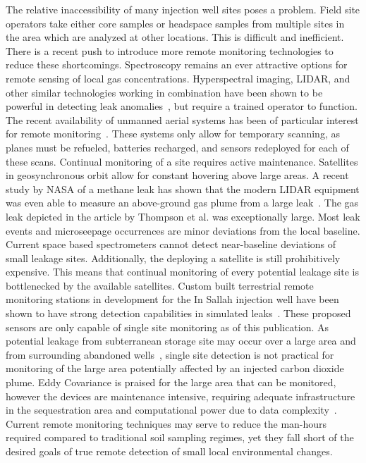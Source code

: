 \documentclass[journal]{IEEEtran}
\begin{document}
The relative inaccessibility of many injection well sites poses a problem.  Field site operators take either core samples or headspace samples from multiple sites in the area which are analyzed at other locations. This is difficult and inefficient.  There is a recent push to introduce more remote monitoring technologies to reduce these shortcomings.  Spectroscopy remains an ever attractive options for remote sensing of local gas concentrations.  Hyperspectral imaging, LIDAR, and other similar technologies working in combination have been shown to be powerful in detecting leak anomalies~\cite{bateson_application_2008, male_using_2009}, but require a trained operator to function.  The recent availability of unmanned aerial systems has been of particular interest for remote monitoring~\cite{salami_uav_2014}.  These systems only allow for temporary scanning, as planes must be refueled, batteries recharged, and sensors redeployed for each of these scans.  Continual monitoring of a site requires active maintenance.  Satellites in geosynchronous orbit allow for constant hovering above large areas.  A recent study by NASA of a methane leak has shown that the modern LIDAR equipment was even able to measure an above-ground gas plume from a large leak~\cite{thompson_space-based_2016}.  The gas leak depicted in the article by Thompson et al. was exceptionally large.  Most leak events and microseepage occurrences are minor deviations from the local baseline.  Current space based spectrometers cannot detect near-baseline deviations of small leakage sites.  Additionally, the deploying a satellite is still prohibitively expensive.  This means that continual monitoring of every potential leakage site is bottlenecked by the available satellites.  Custom built terrestrial remote monitoring stations in development for the In Sallah injection well have been shown to have strong detection capabilities in simulated leaks~\cite{barr_laser-based_2011,humphries_testing_2008}.  These proposed sensors are only capable of single site monitoring as of this publication.  As potential leakage from subterranean storage site may occur over a large area and from surrounding abandoned wells~\cite{nordbotten_model_2009,nordbotten_semianalytical_2005}, single site detection is not practical for monitoring of the large area potentially affected by an injected carbon dioxide plume.  Eddy Covariance is praised for the large area that can be monitored, however the devices are maintenance intensive, requiring adequate infrastructure in the sequestration area and computational power due to data complexity~\cite{klusman_comparison_2011}.  Current remote monitoring techniques may serve to reduce the man-hours required compared to traditional soil sampling regimes, yet they fall short of the desired goals of true remote detection of small local environmental changes.
\end{document}
